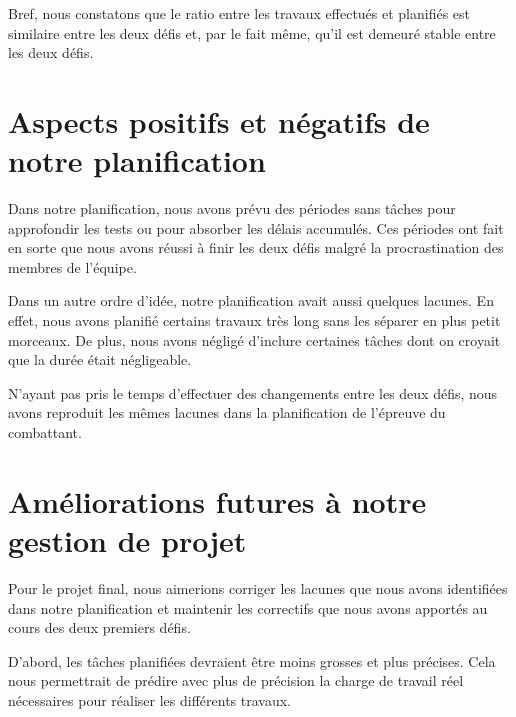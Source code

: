 \begin{spacing}{1.5}
    Bref, nous constatons que le ratio entre les travaux effectués et planifiés est similaire entre les deux défis et, par le fait même, qu'il est demeuré stable entre les deux défis.
\end{spacing}

\pagebreak

\section{Aspects positifs et négatifs de notre planification}

\begin{spacing}{1.5}
    Dans notre planification, nous avons prévu des périodes sans tâches pour approfondir les tests ou pour absorber les délais accumulés.
    Ces périodes ont fait en sorte que nous avons réussi à finir les deux défis malgré la procrastination des membres de l'équipe.
\end{spacing}

\begin{spacing}{1.5}
    Dans un autre ordre d'idée, notre planification avait aussi quelques lacunes.
    En effet, nous avons planifié certains travaux très long sans les séparer en plus petit morceaux.
    De plus, nous avons négligé d'inclure certaines tâches dont on croyait que la durée était négligeable.
\end{spacing}

\begin{spacing}{1.5}
    N'ayant pas pris le temps d'effectuer des changements entre les deux défis, nous avons reproduit les mêmes lacunes dans la planification de l'épreuve du combattant.
\end{spacing}

\section{Améliorations futures à notre gestion de projet}

\begin{spacing}{1.5}
    Pour le projet final, nous aimerions corriger les lacunes que nous avons identifiées dans notre planification et maintenir les correctifs que nous avons apportés au cours des deux premiers défis.
\end{spacing}

\begin{spacing}{1.5}
    D'abord, les tâches planifiées devraient être moins grosses et plus précises.
    Cela nous permettrait de prédire avec plus de précision la charge de travail réel nécessaires pour réaliser les différents travaux.
\end{spacing}

